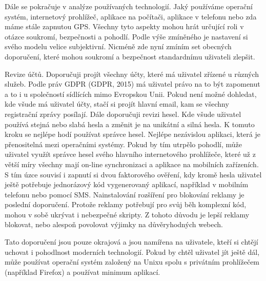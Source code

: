 \documentclass{article}
\begin{document}
\begin{spacing}{1.15}
		Dále se pokračuje v analýze používaných technologií. Jaký používáme operační systém, internetový prohlížeč, aplikace na počítači, aplikace v telefonu nebo zda máme stále zapnutou GPS. Všechny tyto aspekty mohou hrát určující roli v otázce soukromí, bezpečnosti a pohodlí. Podle výše zmíněného je nastavení si svého modelu velice subjektivní. Nicméně zde nyní zmíním set obecných doporučení, které mohou soukromí a bezpečnost standardnímu uživateli zlepšit.
		
		Revize účtů. Doporučuji projít všechny účty, které má uživatel zřízené u různých služeb. Podle práv GDPR (GDPR, 2015) má uživatel právo na to být zapomenut a to i u společností sídlících mimo Evropskou Unii. Pokud není možné dohledat, kde všude má uživatel účty, stačí si projít hlavní email, kam se všechny registrační zprávy posílají. Dále doporučuji revizi hesel. Kde všude uživatel používá stejná nebo slabá hesla a změnit je na unikátní a silná hesla. K tomuto kroku se nejlépe hodí používat správce hesel. Nejlépe nezávislou aplikaci, která je přenositelná mezi operačními systémy. Pokud by tím utrpělo pohodlí, může uživatel využít správce hesel svého hlavního internetového prohlížeče, které už z větší míry všechny mají on-line synchronizaci a aplikace na mobilních zařízeních. S tím úzce souvisí i zapnutí si dvou faktorového ověření, kdy kromě hesla uživatel ještě potřebuje jednorázový kód vygenerovaný aplikací, například v mobilním telefonu nebo pomocí SMS. Nainstalování rozšíření pro blokování reklamy je poslední doporučení. Protože reklamy potřebují pro svůj běh komplexní kód, mohou v sobě ukrývat i nebezpečné skripty. Z tohoto důvodu je lepší reklamy blokovat, nebo alespoň povolovat výjimky na důvěryhodných webech.
		
		Tato doporučení jsou pouze okrajová a jsou namířena na uživatele, kteří si chtějí uchovat i pohodlnost moderních technologií. Pokud by chtěl uživatel jít ještě dál, může používat operační systém založený na Unixu spolu s privátním prohlížečem (například Firefox) a používat minimum aplikací.
		

\end{spacing}
\end{document}
